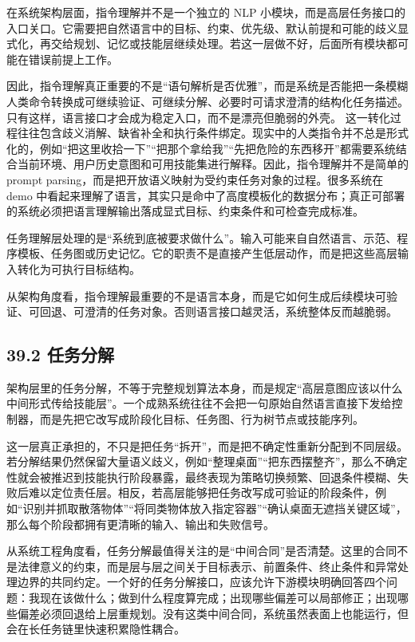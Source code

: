 在系统架构层面，指令理解并不是一个独立的 NLP 小模块，而是高层任务接口的入口关口。它需要把自然语言中的目标、约束、优先级、默认前提和可能的歧义显式化，再交给规划、记忆或技能层继续处理。若这一层做不好，后面所有模块都可能在错误前提上工作。

因此，指令理解真正重要的不是“语句解析是否优雅”，而是系统是否能把一条模糊人类命令转换成可继续验证、可继续分解、必要时可请求澄清的结构化任务描述。只有这样，语言接口才会成为稳定入口，而不是漂亮但脆弱的外壳。 这一转化过程往往包含歧义消解、缺省补全和执行条件绑定。现实中的人类指令并不总是形式化的，例如“把这里收拾一下”“把那个拿给我”“先把危险的东西移开”都需要系统结合当前环境、用户历史意图和可用技能集进行解释。因此，指令理解并不是简单的 prompt parsing，而是把开放语义映射为受约束任务对象的过程。很多系统在 demo 中看起来理解了语言，其实只是命中了高度模板化的数据分布；真正可部署的系统必须把语言理解输出落成显式目标、约束条件和可检查完成标准。

任务理解层处理的是“系统到底被要求做什么”。输入可能来自自然语言、示范、程序模板、任务图或历史记忆。它的职责不是直接产生低层动作，而是把这些高层输入转化为可执行目标结构。

从架构角度看，指令理解最重要的不是语言本身，而是它如何生成后续模块可验证、可回退、可澄清的任务对象。否则语言接口越灵活，系统整体反而越脆弱。

\subsection*{39.2 任务分解}


架构层里的任务分解，不等于完整规划算法本身，而是规定“高层意图应该以什么中间形式传给技能层”。一个成熟系统往往不会把一句原始自然语言直接下发给控制器，而是先把它改写成阶段化目标、任务图、行为树节点或技能序列。

这一层真正承担的，不只是把任务“拆开”，而是把不确定性重新分配到不同层级。若分解结果仍然保留大量语义歧义，例如“整理桌面”“把东西摆整齐”，那么不确定性就会被推迟到技能执行阶段暴露，最终表现为策略切换频繁、回退条件模糊、失败后难以定位责任层。相反，若高层能够把任务改写成可验证的阶段条件，例如“识别并抓取散落物体”“将同类物体放入指定容器”“确认桌面无遮挡关键区域”，那么每个阶段都拥有更清晰的输入、输出和失败信号。

从系统工程角度看，任务分解最值得关注的是“中间合同”是否清楚。这里的合同不是法律意义的约束，而是层与层之间关于目标表示、前置条件、终止条件和异常处理边界的共同约定。一个好的任务分解接口，应该允许下游模块明确回答四个问题：我现在该做什么；做到什么程度算完成；出现哪些偏差可以局部修正；出现哪些偏差必须回退给上层重规划。没有这类中间合同，系统虽然表面上也能运行，但会在长任务链里快速积累隐性耦合。

